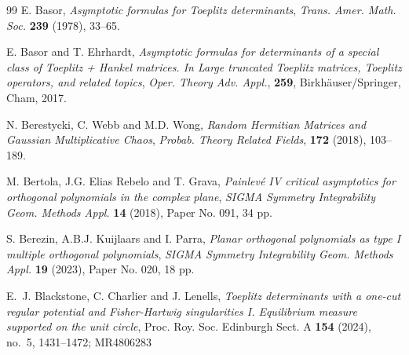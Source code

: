 \documentclass[reqno]{amsart}
\newcommand{\1}{\mathds{1}}
\numberwithin{equation}{section}
\theoremstyle{definition}
\begin{document}
\begin{thebibliography}{99}
 E. Basor, \emph{Asymptotic formulas for Toeplitz determinants}, {\em Trans.
Amer. Math. Soc.} {\bf 239}  (1978), 33--65.

 E. Basor and T. Ehrhardt, \emph{Asymptotic formulas for determinants of a special class of Toeplitz + Hankel matrices. In \textit{Large truncated Toeplitz matrices, Toeplitz operators, and related topics}}, \textit{Oper. Theory Adv. Appl.}, \textbf{259}, Birkhäuser/Springer, Cham, 2017. 




 N. Berestycki, C. Webb and M.D. Wong, \emph{Random Hermitian Matrices and Gaussian Multiplicative Chaos}, \textit{Probab. Theory Related Fields}, \textbf{172} (2018), 103--189.



 M. Bertola, J.G. Elias Rebelo and T. Grava, \emph{Painlev\'{e} IV critical asymptotics for orthogonal polynomials in the complex plane}, \textit{SIGMA Symmetry Integrability Geom. Methods Appl.} \textbf{14} (2018), Paper No. 091, 34 pp.





 S. Berezin, A.B.J. Kuijlaars and I. Parra, \emph{Planar orthogonal polynomials as type I multiple orthogonal polynomials}, \textit{SIGMA Symmetry Integrability Geom. Methods Appl.} \textbf{19} (2023), Paper No. 020, 18 pp.

E.~J. Blackstone, C. Charlier and J. Lenells, \emph{Toeplitz determinants with a one-cut regular potential and Fisher-Hartwig singularities I. Equilibrium measure supported on the unit circle}, Proc. Roy. Soc. Edinburgh Sect. A {\bf 154} (2024), no.~5, 1431--1472; MR4806283


\end{thebibliography}
\end{document}
